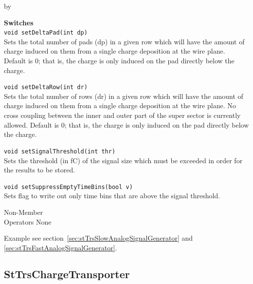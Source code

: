 \documentclass[twoside]{article}
\newcommand{\entrylabel}[1]{\mbox{\textbf{{#1}}}\hfil}%
\newenvironment{entry}
{\begin{list}{}%
    {\renewcommand{\makelabel}{\entrylabel}%
     \setlength{\labelwidth}{90pt}%
     \setlength{\leftmargin}{\labelwidth}
     \advance\leftmargin by \labelsep%
      }%
    }%
  {\end{list}}
\newcommand{\Entrylabel}[1]%
{\raisebox{0pt}[1ex][0pt]{\makebox[\labelwidth][l]%
    {\parbox[t]{\labelwidth}{\hspace{0pt}\textbf{{#1}}}}}}
\newenvironment{Entry}%
{\renewcommand{\entrylabel}{\Entrylabel}\begin{entry}}%
  {\end{entry}}
\begin{document}
\begin{Entry}
  {\bf Switches \\}
  \verb+void setDeltaPad(int dp)+\\
  Sets the total number of pads (dp) in a given row which will have the
  amount of charge induced on them from a single charge deposition
  at the wire  plane.  Default is 0; that is, the charge is only induced
  on the pad directly below the charge.

  \verb+void setDeltaRow(int dr)+\\
  Sets the total number of rows (dr) in a given row which will have the
  amount of charge induced on them from a single charge deposition
  at the wire plane.  No cross coupling between the inner and outer part
  of the super sector is currently allowed.  Default is 0; that is,
  the charge is only induced
  on the pad directly below the charge.

  \verb+void setSignalThreshold(int thr)+\\
  Sets the threshold (in fC) of the signal size which must be
  exceeded in order for the results to be stored.

  \verb+void setSuppressEmptyTimeBins(bool v)+\\
  Sets flag to write out only time bins that are above
  the signal threshold.

\item[Non-Member \\ Operators]
  None

\item[Example]
  see section~\ref{sec:stTrsSlowAnalogSignalGenerator} and 
  \ref{sec:stTrsFastAnalogSignalGenerator}.

\end{Entry}
\clearpage


%
%
\subsection{StTrsChargeTransporter} 
\label{sec:stTrsChargeTransporter}
\end{document}
